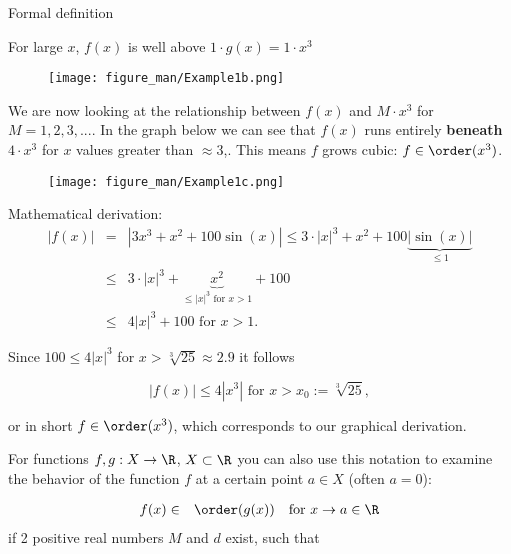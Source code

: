 \documentclass[11pt,compress,t,notes=noshow, xcolor=table]{beamer}
\begin{document}
\begin{vbframe}{Formal definition}

For large $x$, $f(x)$ is well above $1 \cdot g(x) = 1 \cdot x^3$

\lz

\begin{center}
\begin{figure}
  \texttt{[image: figure\_man/Example1b.png]}
\end{figure}
\end{center}


\framebreak

We are now looking at the relationship between $f(x)$ and $M\cdot x^3$ for $M = 1, 2, 3, ...$. In the graph below we can see that $f(x)$ runs entirely \textbf{beneath} $4 \cdot x^3$ for $x$ values greater than $\approx 3$,. This means $f$ grows cubic: $f \in \order(x^3)$.


\begin{center}
\begin{figure}
  \texttt{[image: figure\_man/Example1c.png]}
\end{figure}
\end{center}

\framebreak

Mathematical derivation:
\begin{eqnarray*}
|f(x)| &=& | 3 x^3 + x^2 + 100 \sin(x) | \le 3 \cdot |x|^3 + x^2 + 100 \underbrace{|\sin(x)|}_{\le 1} \\ &\le& 3 \cdot |x|^3 + \underbrace{x^2}_{\le |x|^3 \text{ for } x > 1} + 100 \\ %
&\le& 4 |x|^3 + 100 \text{  for  } x > 1.
\end{eqnarray*}

Since $100 \le 4 |x|^3$ for $x > \sqrt[3]{25} \approx 2.9$ it follows

$$
|f(x)| \le 4 |x^3| \text{  for  } x > x_0 := \sqrt[3]{25},
$$

or in short $f \in \order(x^3)$, which corresponds to our graphical derivation.


\framebreak

For functions $f, g: X \to \R$, $X\subset \R$ you can also use this notation to examine the behavior of the function $f$ at a certain point $a \in X$ (often $a=0$):

\begin{eqnarray*}
  f(x) &\in& \order(g(x)) \quad \text{for } x \to a \in \R \\
\end{eqnarray*}
if 2 positive real numbers $M$ and $d$ exist, such that


\end{vbframe}
\end{document}
